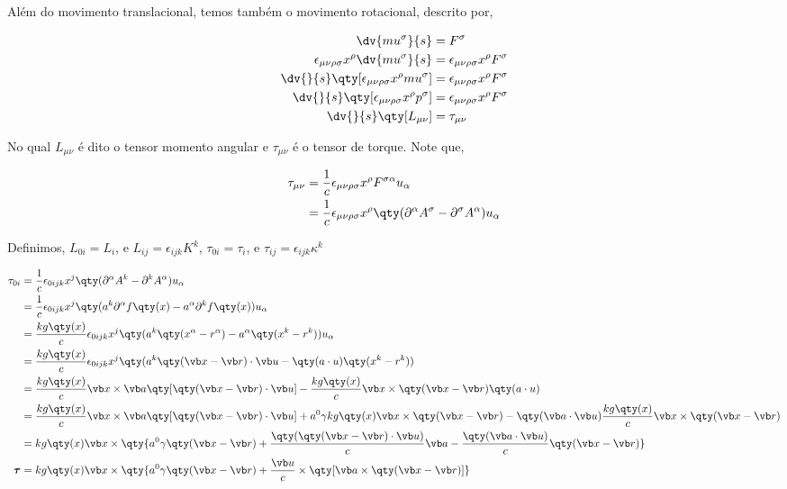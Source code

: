 \documentclass[twoside]{amsart}
\numberwithin{equation}{section}
\begin{document}
\begin{refsection}
Além do movimento translacional, temos também o movimento rotacional, descrito por,

\begin{align}
    \dv{mu^\sigma}{s}&=F^\sigma\\
    \epsilon_{\mu\nu\rho\sigma}x^\rho\dv{mu^\sigma}{s}&=\epsilon_{\mu\nu\rho\sigma}x^\rho F^\sigma\\
    \dv{}{s}\qty[\epsilon_{\mu\nu\rho\sigma}x^\rho mu^\sigma]&=\epsilon_{\mu\nu\rho\sigma}x^\rho F^\sigma\\
    \dv{}{s}\qty[\epsilon_{\mu\nu\rho\sigma}x^\rho p^\sigma]&=\epsilon_{\mu\nu\rho\sigma}x^\rho F^\sigma\\
    \dv{}{s}\qty[L_{\mu\nu}]&=\tau_{\mu\nu}
\end{align}

No qual $L_{\mu\nu}$ é dito o tensor momento angular e $\tau_{\mu\nu}$ é o tensor de torque. Note que,

\begin{align}
    \tau_{\mu\nu}&=\frac1c\epsilon_{\mu\nu\rho\sigma}x^\rho F^{\sigma\alpha}u_\alpha\\
    &=\frac1c\epsilon_{\mu\nu\rho\sigma}x^\rho\qty(\partial^\alpha A^\sigma-\partial^\sigma A^\alpha)u_\alpha
\end{align}

Definimos, $L_{0i}=L_i$, e $L_{ij}=\epsilon_{ijk}K^k$, $\tau_{0i}=\tau_i$, e $\tau_{ij}=\epsilon_{ijk}\kappa^k$ 

\begin{align}
    \tau_{0i}&=\frac1c\epsilon_{0ijk}x^j\qty(\partial^\alpha A^k-\partial^k A^\alpha)u_\alpha\\
    &=\frac1c\epsilon_{0ijk}x^j\qty(a^k\partial^\alpha f\qty(x)-a^\alpha\partial^k f\qty(x))u_\alpha\\
    &=\frac{kg\qty(x)}{c}\epsilon_{0ijk}x^j\qty(a^k\qty(x^\alpha-r^\alpha)-a^\alpha\qty(x^k-r^k))u_\alpha\\
    &=\frac{kg\qty(x)}{c}\epsilon_{0ijk}x^j\qty(a^k\qty(\vb x-\vb r)\cdot \vb u-\qty(a\cdot u)\qty(x^k-r^k))\\
    &=\frac{kg\qty(x)}{c}\vb x\times \vb a \qty[\qty(\vb x-\vb r)\cdot \vb u]-\frac{kg\qty(x)}{c}\vb x\times\qty(\vb x-\vb r)\qty(a\cdot u)\\
    &=\frac{kg\qty(x)}{c}\vb x\times \vb a \qty[\qty(\vb x-\vb r)\cdot \vb u]+a^0\gamma kg\qty(x)\vb x\times\qty(\vb x-\vb r)-\qty(\vb a\cdot \vb u)\frac{kg\qty(x)}{c}\vb x\times \qty(\vb x-\vb r)\\
    &=kg\qty(x)\vb x\times\qty{a^0\gamma\qty(\vb x-\vb r)+\frac{\qty(\qty(\vb x-\vb r)\cdot \vb u)}{c}\vb a-\frac{\qty(\vb a\cdot \vb u)}{c}\qty(\vb x -\vb r)}\\
    \boldsymbol \tau&=kg\qty(x)\vb x\times\qty{a^0\gamma\qty(\vb x-\vb r)+\frac{\vb u}{c}\times \qty[\vb a\times\qty(\vb x-\vb r)]}
\end{align}


\end{refsection}
\end{document}
